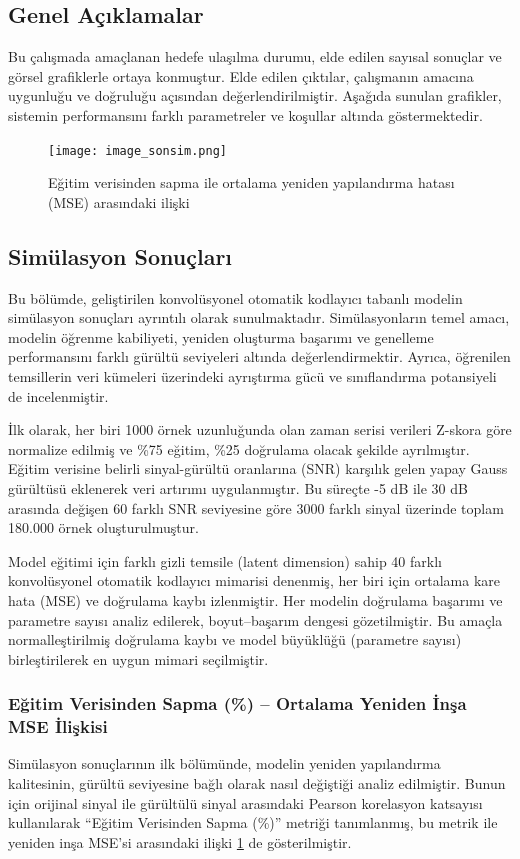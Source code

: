 \subsection{Genel Açıklamalar}
Bu çalışmada amaçlanan hedefe ulaşılma durumu, elde edilen sayısal sonuçlar ve görsel grafiklerle ortaya konmuştur. Elde edilen çıktılar, çalışmanın amacına uygunluğu ve doğruluğu açısından değerlendirilmiştir. Aşağıda sunulan grafikler, sistemin performansını farklı parametreler ve koşullar altında göstermektedir.

\begin{figure}[H]
    \centering
    \texttt{[image: image\_sonsim.png]}
    \caption{Eğitim verisinden sapma ile ortalama yeniden yapılandırma hatası (MSE) arasındaki ilişki}
    \label{fig:sonsim1}
\end{figure}

\subsection{Simülasyon Sonuçları}
Bu bölümde, geliştirilen konvolüsyonel otomatik kodlayıcı tabanlı modelin simülasyon sonuçları ayrıntılı olarak sunulmaktadır. Simülasyonların temel amacı, modelin öğrenme kabiliyeti, yeniden oluşturma başarımı ve genelleme performansını farklı gürültü seviyeleri altında değerlendirmektir. Ayrıca, öğrenilen temsillerin veri kümeleri üzerindeki ayrıştırma gücü ve sınıflandırma potansiyeli de incelenmiştir.

İlk olarak, her biri 1000 örnek uzunluğunda olan zaman serisi verileri Z-skora göre normalize edilmiş ve \%75 eğitim, \%25 doğrulama olacak şekilde ayrılmıştır. Eğitim verisine belirli sinyal-gürültü oranlarına (SNR) karşılık gelen yapay Gauss gürültüsü eklenerek veri artırımı uygulanmıştır. Bu süreçte -5 dB ile 30 dB arasında değişen 60 farklı SNR seviyesine göre 3000 farklı sinyal üzerinde toplam 180.000 örnek oluşturulmuştur.

Model eğitimi için farklı gizli temsile (latent dimension) sahip 40 farklı konvolüsyonel otomatik kodlayıcı mimarisi denenmiş, her biri için ortalama kare hata (MSE) ve doğrulama kaybı izlenmiştir. Her modelin doğrulama başarımı ve parametre sayısı analiz edilerek, boyut–başarım dengesi gözetilmiştir. Bu amaçla normalleştirilmiş doğrulama kaybı ve model büyüklüğü (parametre sayısı) birleştirilerek en uygun mimari seçilmiştir.



\subsubsection{Eğitim Verisinden Sapma (\%) – Ortalama Yeniden İnşa MSE İlişkisi}
Simülasyon sonuçlarının ilk bölümünde, modelin yeniden yapılandırma kalitesinin, gürültü seviyesine bağlı olarak nasıl değiştiği analiz edilmiştir. Bunun için orijinal sinyal ile gürültülü sinyal arasındaki Pearson korelasyon katsayısı kullanılarak “Eğitim Verisinden Sapma (\%)” metriği tanımlanmış, bu metrik ile yeniden inşa MSE’si arasındaki ilişki \ref{fig:sonsim1} de gösterilmiştir.


